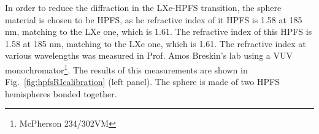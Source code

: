In order to reduce the diffraction in the LXe-HPFS transition, the sphere material is chosen to be HPFS, as he refractive index of it HPFS is 1.58 at 185 nm, matching to the LXe one, which is 1.61. The refractive index of this HPFS is 1.58 at 185 nm, matching to the LXe one, which is 1.61. The refractive index at various wavelengths was measured in Prof. Amos Breskin's lab using a VUV monochromator\footnote{McPherson 234/302VM}. The results of this measurements are shown in Fig.~\ref{fig:hpfsRIcalibration} (left panel). The sphere is made of two HPFS hemispheres bonded together.

\begin{figure}
\centering
\begin{minipage}[c]{0.45\textwidth}
\end{minipage}	
\begin{minipage}[c]{0.45\textwidth}
\end{minipage}	
\end{figure}

